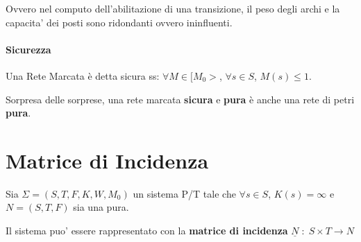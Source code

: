 Ovvero nel computo dell'abilitazione di una transizione, il peso degli archi e la capacita' dei posti sono ridondanti ovvero ininfluenti.

\paragraph{Sicurezza}

Una Rete Marcata \`e detta sicura ss: $\forall M \in [M_0>$, $\forall s \in S$, $M(s) \leq 1$.

Sorpresa delle sorprese, una rete marcata \textbf{sicura} e \textbf{pura} \`e anche una rete di petri \textbf{pura}.

\section{Matrice di Incidenza}

Sia $\Sigma = (S, T, F, K, W, M_0)$ un sistema P/T tale che $\forall s \in S$, $K(s) = \infty$ e $N = (S, T, F)$ sia una pura.

Il sistema puo' essere rappresentato con la \textbf{matrice di incidenza} $\underline N \; : \; S \times T \rightarrow N$
